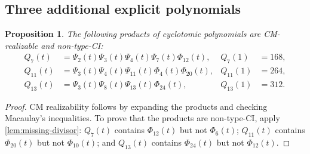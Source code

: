 \documentclass[11pt,a4paper]{amsart}
\newtheorem{proposition}[proposition]{Proposition}
\theoremstyle{definition}
\theoremstyle{remark}
\begin{document}
\subsection{Three additional explicit polynomials}
\begin{proposition}\label{prop:Q-seeds}
The following products of cyclotomic polynomials are CM-realizable and non-type-CI:
\begin{align*}
Q_7(t)&=\Psi_2(t)\Psi_3(t)\Psi_4(t)\Psi_7(t)\Phi_{12}(t),&Q_7(1)&=168,\\
Q_{11}(t)&=\Psi_3(t)\Psi_4(t)\Psi_{11}(t)\Phi_4(t)\Phi_{20}(t),&Q_{11}(1)&=264,\\
Q_{13}(t)&=\Psi_3(t)\Psi_8(t)\Psi_{13}(t)\Phi_{24}(t),&Q_{13}(1)&=312.
\end{align*}
\end{proposition}
\begin{proof}
CM realizability follows by expanding the products and checking Macaulay's inequalities. To prove that the products are non-type-CI, apply \cref{lem:missing-divisor}: $Q_7(t)$ contains $\Phi_{12}(t)$ but not $\Phi_6(t)$; $Q_{11}(t)$ contains $\Phi_{20}(t)$ but not $\Phi_{10}(t)$; and $Q_{13}(t)$ contains $\Phi_{24}(t)$ but not $\Phi_{12}(t)$.
\end{proof}
\end{document}

